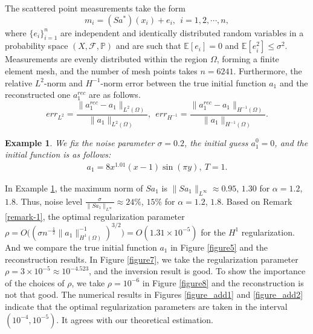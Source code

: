 \documentclass[11pt]{article}
\newtheorem{example}{Example}
\numberwithin{equation}{section}
\begin{document}
The scattered point measurements take the form
$$m_i = (Sa^*)(x_i) + e_i, ~~ i = 1,2,\cdots,n,$$
where $\{e_i\}_{i=1}^n$ are independent and identically distributed random variables in a probability space $(X, \mathscr{F}, \mathbb{P})$ and are such that $\mathbb E[e_i]=0$ and $\mathbb E[e_i^2] \le \sigma^2$. Measurements are evenly distributed within the region $\Omega$, forming a finite element mesh, and the number of mesh points takes $n=6241$. Furthermore, the relative $L^2$-norm and $H^{-1}$-norm error between the true initial function $a_1$ and the reconstructed one $a_1^{rec}$ are as follows.
$$err_{L^2}=\frac{\|a_1^{rec}-a_1\|_{L^2(\Omega)}}{\|a_1\|_{L^2(\Omega)}},~~err_{H^{-1}}=\frac{\|a_1^{rec}-a_1\|_{H^{-1}(\Omega)}}{\|a_1\|_{H^{-1}(\Omega)}}.$$
\begin{example}\label{ex-sigma=0.2}
We fix the noise parameter $\sigma=0.2$, the initial guess $a_1^0=0$, and the initial function is as follows:
\begin{align*}
a_1=8x^{1.01}(x-1)\sin(\pi y),~T=1.
\end{align*}
\end{example}

In Example \ref{ex-sigma=0.2}, the maximum norm of $Sa_1$ is $\|Sa_1\|_{L^\infty} \approx 0.95$, $1.30$ for $\alpha=1.2$, $1.8$. Thus, noise level $\frac{\sigma}{\|Sa_1\|_{L^\infty}}\approx24\%$, $15\%$ for $\alpha=1.2$, $1.8$.
Based on Remark \ref{remark-1}, the optimal regularization parameter $\rho = O\big((\sigma n^{-\frac12} \|a_1\|^{-1}_{H^1(\Omega)})^{3/2}\big)=O( 1.31\times 10^{-5})$ for the $H^1$ regularization. And we compare the true initial function $a_1$ in Figure \ref{figure5} and the reconstruction results. In Figure \ref{figure7}, we take the regularization parameter $\rho=3\times10^{-5}\approx 10^{-4.523}$, and the inversion result is good. To show the importance of the choices of $\rho$, we take $\rho=10^{-6}$ in Figure \ref{figure8} and the reconstruction is not that good.
The numerical results in Figures \ref{figure_add1} and \ref{figure_add2} indicate that the optimal regularization parameters are taken in the interval $(10^{-4},10^{-5})$. It agrees with our theoretical estimation.
\end{document}
